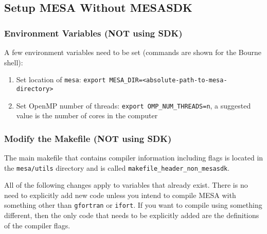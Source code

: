\subsection{Setup {\sf MESA} Without {\sf MESASDK}}
\label{sec:woSDK}

\subsubsection{Environment Variables (NOT using SDK)}
A few environment variables need to be set (commands are shown for the 
Bourne shell):
\begin{enumerate}
\item Set location of {\tt mesa}: 
{\tt export MESA\_DIR=<absolute-path-to-mesa-directory>}

\item Set OpenMP number of threads: {\tt export OMP\_NUM\_THREADS=n}, a suggested value is the number of cores in the computer
\end{enumerate}

\subsubsection{Modify the Makefile (NOT using SDK)}
The main makefile that contains compiler information including flags is 
located in the {\tt mesa/utils} directory and is called 
{\tt makefile\_header\_non\_mesasdk}. 

All of the following changes apply to 
variables that already exist. There is no need to explicitly add new code 
unless you intend to compile {\sf MESA} with something other than 
{\tt gfortran} or {\tt ifort}. If you want to compile using something 
different, then the only code that needs to be explicitly added are the 
definitions of the compiler flags. 

